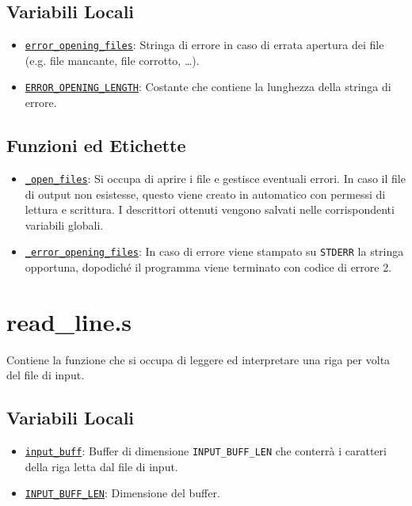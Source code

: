 \documentclass[a4paper,11pt]{article}
\newcommand{\itemtt}[1]{\item \texttt{#1}}
\begin{document}
	\subsection{Variabili Locali} 
	\begin{itemize}
		\itemtt{\hyperref[v:2:1]{error\_opening\_files}}: Stringa di errore in caso di errata apertura dei file (e.g. file mancante, file corrotto, \ldots).
		\itemtt{\hyperref[v:2:2]{ERROR\_OPENING\_LENGTH}}: Costante che contiene la lunghezza della stringa di errore.
	\end{itemize}
	
	\subsection{Funzioni ed Etichette}
	\begin{itemize}
		\itemtt{\hyperref[e:2:1]{\_open\_files}}: Si occupa di aprire i file e gestisce eventuali errori. In caso il file di output non esistesse, questo viene creato in automatico con permessi di lettura e scrittura. I descrittori ottenuti vengono salvati nelle corrispondenti variabili globali. 
		\itemtt{\hyperref[e:2:2]{\_error\_opening\_files}}: In caso di errore viene stampato su \texttt{STDERR} la stringa opportuna, dopodiché il programma viene terminato con codice di errore 2. 
	\end{itemize}
	
	\section{read\_line.s}
	Contiene la funzione che si occupa di leggere ed interpretare una riga per volta del file di input.
	\subsection{Variabili Locali}
	\begin{itemize}
		\itemtt{\hyperref[v:3:1]{input\_buff}}: Buffer di dimensione \texttt{INPUT\_BUFF\_LEN} che conterrà i caratteri della riga letta dal file di input.
		\itemtt{\hyperref[v:3:2]{INPUT\_BUFF\_LEN}}: Dimensione del buffer.
	\end{itemize}
	
\end{document}
